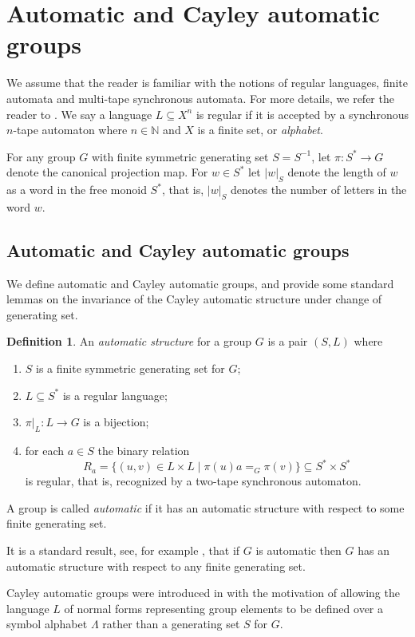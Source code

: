 \documentclass[11pt]{amsart}
\newcommand{\be}{\begin{enumerate}}
\newcommand{\ee}{\end{enumerate}}
\theoremstyle{definition}
\newtheorem{definition}[theorem]{Definition}
\newcommand\N{\mathbb N}
\begin{document}
\section{Automatic and Cayley automatic groups}
\label{sec:Auto-CGA}


We assume that the reader is familiar with the notions of regular languages, finite automata and  multi-tape synchronous automata.  For more details, we refer the reader to \cite{Epsteinbook}. We say a language $L\subseteq X^n$ is regular if it is accepted by a synchronous $n$-tape automaton where $n\in\N$ and $X$ is a finite set, or {\em alphabet}.

For any group $G$ with finite symmetric generating set $S=S^{-1}$, let $\pi\colon S^*\to G$ denote the canonical projection map. For $w\in S^*$ let $|w|_S$ denote the length of $w$ as a word in the free monoid $S^*$, that is, $|w|_S$ denotes the number of letters in the word $w$.


\subsection{Automatic and Cayley automatic groups}

We define automatic and Cayley automatic groups, and provide some standard lemmas on the invariance of the  Cayley automatic structure under change of generating set.

\begin{definition}
\label{def:aut}
An {\em automatic structure} for a group $G$ is a pair $(S,L)$ where
\be
\item $S$ is a finite symmetric generating set for $G$;
\item $L\subseteq S^*$ is a regular language;
\item  $\pi|_L \colon L \rightarrow G$ is
a bijection;
\item for each $a \in S$ the binary relation
$$R_a = \{(u,v) \in L \times L \mid \pi(u)a=_G\pi(v)\} \subseteq S^* \times S^*$$
is regular, that is, recognized by a two-tape synchronous automaton.
\ee
A group is called {\em automatic} if it has an automatic structure with respect to some finite generating set.
\end{definition} It is a standard result, see, for example \cite[Theorem 2.4.1]{Epsteinbook}, that if $G$ is automatic  then $G$ has an automatic structure with respect to any finite generating set.


Cayley automatic groups were introduced in \cite{KKMjournal} with the motivation of
allowing the language $L$ of normal forms representing group elements to be defined over a
symbol alphabet $\Lambda$ rather than a generating set $S$ for $G$.
\end{document}
